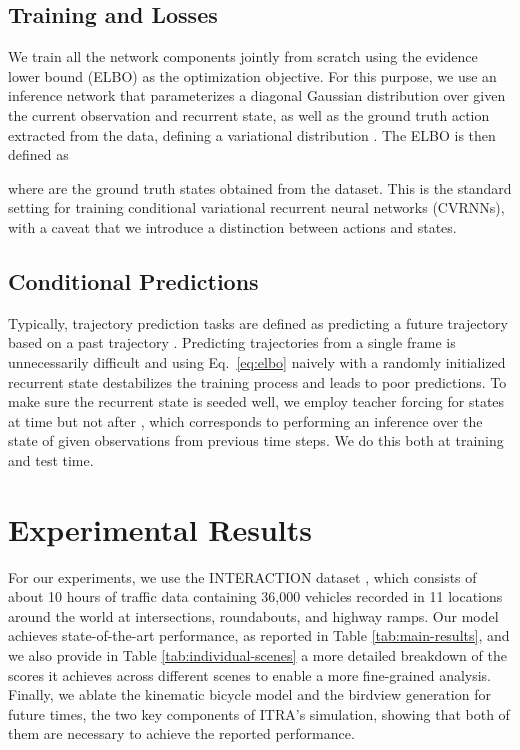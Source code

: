 \documentclass[letterpaper, 10 pt, conference]{ieeeconf}
\begin{document}
\subsection{Training and Losses}

We train all the network components jointly from scratch using the evidence lower bound (ELBO) as the optimization objective. For this purpose, we use an inference network that parameterizes a diagonal Gaussian distribution over  given the current observation and recurrent state, as well as the ground truth action extracted from the data, defining a variational distribution . The ELBO is then defined as

where  are the ground truth states obtained from the dataset. This is the standard setting for training conditional variational recurrent neural networks (CVRNNs), with a caveat that we introduce a distinction between actions and states.

\subsection{Conditional Predictions}

Typically, trajectory prediction tasks are defined as predicting a future trajectory  based on a past trajectory . Predicting trajectories from a single frame is unnecessarily difficult and using Eq.~\ref{eq:elbo} naively with a randomly initialized recurrent state  destabilizes the training process and leads to poor predictions. To make sure the recurrent state is seeded well, we employ teacher forcing for states  at time  but not after , which corresponds to performing an inference over the state of  given observations from previous time steps. We do this both at training and test time. 


\section{Experimental Results}

For our experiments, we use the INTERACTION dataset \cite{zhan_interaction_2019}, which consists of about 10 hours of traffic data containing 36,000 vehicles recorded in 11 locations around the world at intersections, roundabouts, and highway ramps. Our model achieves state-of-the-art performance, as reported in Table \ref{tab:main-results}, and we also provide in Table \ref{tab:individual-scenes} a more detailed breakdown of the scores it achieves across different scenes to enable a more fine-grained analysis. Finally, we ablate the kinematic bicycle model and the birdview generation for future times, the two key components of ITRA's simulation, showing that both of them are necessary to achieve the reported performance.
\end{document}
